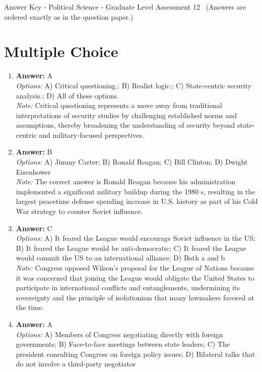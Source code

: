 \documentclass[12pt]{article}
\begin{document}
\begin{center}
Answer Key - Political Science - Graduate Level Assessment 12 \
\small (Answers are ordered exactly as in the question paper.)
\end{center}

\section*{Multiple Choice}
\begin{enumerate}[label=\arabic*.]
\item \textbf{Answer:} A
\\ \textit{Options:} A) Critical questioning.; B) Realist logic.; C) State-centric security analysis.; D) All of these options.
\\ \textit{Note:} Critical questioning represents a move away from traditional interpretations of security studies by challenging established norms and assumptions, thereby broadening the understanding of security beyond state-centric and military-focused perspectives.
\item \textbf{Answer:} B
\\ \textit{Options:} A) Jimmy Carter; B) Ronald Reagan; C) Bill Clinton; D) Dwight Eisenhower
\\ \textit{Note:} The correct answer is Ronald Reagan because his administration implemented a significant military buildup during the 1980 s, resulting in the largest peacetime defense spending increase in U.S. history as part of his Cold War strategy to counter Soviet influence.
\item \textbf{Answer:} C
\\ \textit{Options:} A) It feared the League would encourage Soviet influence in the US; B) It feared the League would be anti-democratic; C) It feared the League would commit the US to an international alliance; D) Both a and b
\\ \textit{Note:} Congress opposed Wilson's proposal for the League of Nations because it was concerned that joining the League would obligate the United States to participate in international conflicts and entanglements, undermining its sovereignty and the principle of isolationism that many lawmakers favored at the time.
\item \textbf{Answer:} A
\\ \textit{Options:} A) Members of Congress negotiating directly with foreign governments; B) Face-to-face meetings between state leaders; C) The president consulting Congress on foreign policy issues; D) Bilateral talks that do not involve a third-party negotiator

\end{enumerate}
\end{document}

